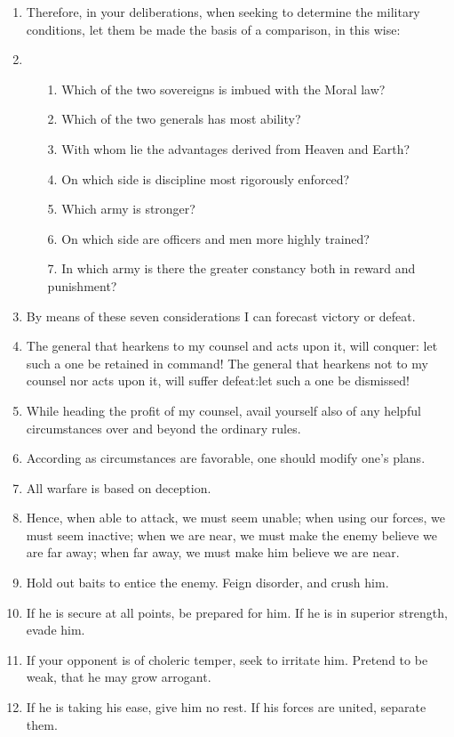 \documentclass[oneside]{book}
\begin{document}
\begin{enumerate}
    \item Therefore, in your deliberations, when seeking to determine the military conditions, let them be made the basis of a comparison, in this wise:
    \item \begin{enumerate}
        \item[1.] Which of the two sovereigns is imbued with the Moral law?
        \item[2.] Which of the two generals has most ability?
        \item[3.] With whom lie the advantages derived from Heaven and Earth?
        \item[4.] On which side is discipline most rigorously enforced?
        \item[5.] Which army is stronger?
        \item[6.] On which side are officers and men more highly trained?
        \item[7.] In which army is there the greater constancy both in reward and punishment?
    \end{enumerate}
    \item By means of these seven considerations I can forecast victory or defeat.
    \item The general that hearkens to my counsel and acts upon it, will conquer: let such a one be retained in command! The general that hearkens not to my counsel nor acts upon it, will suffer defeat:let such a one be dismissed!
    \item While heading the profit of my counsel, avail yourself also of any helpful circumstances over and beyond the ordinary rules.
	\item According as circumstances are favorable, one should modify one's plans.
	\item All warfare is based on deception.
	\item Hence, when able to attack, we must seem unable; when using our forces, we must seem inactive; when we are near, we must make the enemy believe we are far away; when far away, we must make him believe we are near.
	\item Hold out baits to entice the enemy. Feign disorder, and crush him.
	\item If he is secure at all points, be prepared for him. If he is in superior strength, evade him.
	\item If your opponent is of choleric temper, seek to irritate him. Pretend to be weak, that he may grow arrogant.
	\item If he is taking his ease, give him no rest. If his forces are united, separate them.

\end{enumerate}
\end{document}
